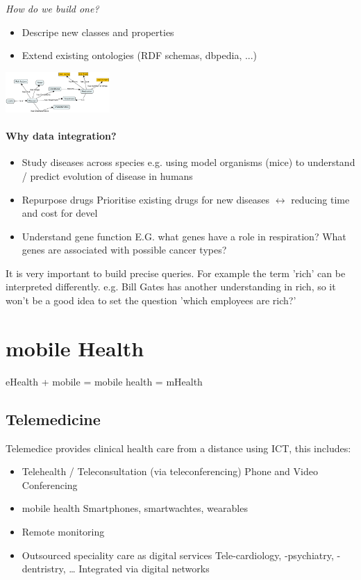 \documentclass{report}
\newenvironment{Figure}
	{\par\medskip\noindent\minipage{\linewidth}}
	{\endminipage\par\medskip}
\theoremstyle{definition}
\theoremstyle{example}
\begin{document}
\textit{How do we build one?}
\begin{itemize}
   \item Descripe new classes and properties
   \item Extend existing ontologies (RDF schemas, dbpedia, ...)
\end{itemize}

\begin{Figure}
   \centering
    \includegraphics[width=150px]{img/simpleOntology.png}
        \label{fig:Simple Ontology}
\end{Figure}

\subsubsection{Why data integration?}
\begin{itemize}
   \item Study diseases across species
   \subitem e.g. using model organisms (mice) to understand / predict evolution of disease in humans 
   \item Repurpose drugs
   \subitem Prioritise existing drugs for new diseases $\leftrightarrow$ reducing time and cost for devel 
   \item Understand gene function 
   \subitem E.G. what genes have a role in respiration?
   \subitem What genes are associated with possible cancer types? 
\end{itemize}

It is very important to build precise queries. For example the term 'rich' can be interpreted differently. e.g. Bill Gates has another understanding in rich, so it won't be a good idea to set the question 'which employees are rich?'


\chapter{mobile Health}
eHealth + mobile = mobile health = mHealth

\section{Telemedicine}
Telemedice provides clinical health care from a distance using ICT, this includes:
\begin{itemize}
   \item Telehealth / Teleconsultation (via teleconferencing)
   \subitem Phone and Video Conferencing 
   \item mobile health
   \subitem Smartphones, smartwachtes, wearables 
   \item Remote monitoring
   \item Outsourced speciality care as digital services
   \subitem Tele-cardiology, -psychiatry, -dentristry, \dots
   \subitem Integrated via digital networks 
\end{itemize}
\end{document}
